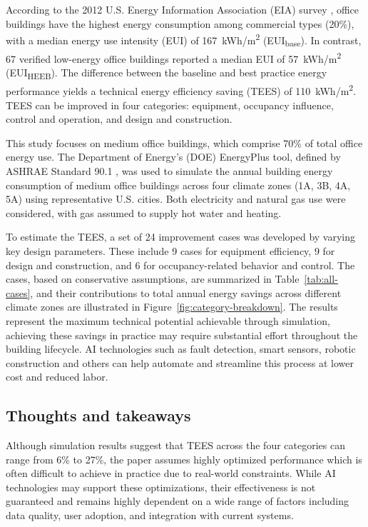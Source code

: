\documentclass[conference,a4paper]{IEEEtran}
\begin{document}
According to the 2012 U.S. Energy Information Association (EIA) survey \cite{USEIACommercial}, office buildings have the highest energy consumption among commercial types (20\%), with a median energy use intensity (EUI) of 167~kWh/m\textsuperscript{2} (EUI\textsubscript{base}). In contrast, 67 verified low-energy office buildings reported a median EUI of 57~kWh/m\textsuperscript{2} (EUI\textsubscript{HEEB}). The difference between the baseline and best practice energy performance yields a technical energy efficiency saving (TEES) of 110~kWh/m\textsuperscript{2}. TEES can be improved in four categories: equipment, occupancy influence, control and operation, and design and construction.

This study focuses on medium office buildings, which comprise 70\% of total office energy use. The Department of Energy's (DOE) EnergyPlus tool, defined by ASHRAE Standard 90.1 \cite{ASHRAEANSIASHRAE}, was used to simulate the annual building energy consumption of medium office buildings across four climate zones (1A, 3B, 4A, 5A) using representative U.S. cities. Both electricity and natural gas use were considered, with gas assumed to supply hot water and heating. 

To estimate the TEES, a set of 24 improvement cases was developed by varying key design parameters. These include 9 cases for equipment efficiency, 9 for design and construction, and 6 for occupancy-related behavior and control. The cases, based on conservative assumptions, are summarized in Table~\ref{tab:all-cases}, and their contributions to total annual energy savings across different climate zones are illustrated in Figure~\ref{fig:category-breakdown}. The results represent the maximum technical potential achievable through simulation, achieving these savings in practice may require substantial effort throughout the building lifecycle. AI technologies such as fault detection, smart sensors, robotic construction and others can help automate and streamline this process at lower cost and reduced labor.

\subsection*{Thoughts and takeaways}
Although simulation results suggest that TEES across the four categories can range from 6\% to 27\%, the paper assumes highly optimized performance which is often difficult to achieve in practice due to real-world constraints. While AI technologies may support these optimizations, their effectiveness is not guaranteed and remains highly dependent on a wide range of factors including data quality, user adoption, and integration with current systems.
\end{document}
